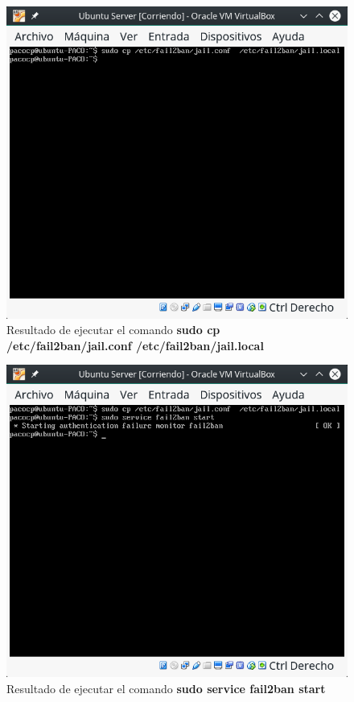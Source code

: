 \begin{figure}[H] %
	\centering
	\includegraphics[scale=0.5]{figuras/figura12.png}  %
	
	
	\caption{Resultado de ejecutar el comando \textbf{sudo cp /etc/fail2ban/jail.conf /etc/fail2ban/jail.local}}
	\label{figura12}
\end{figure}

\begin{figure}[H] %
	\centering
	\includegraphics[scale=0.5]{figuras/figura13.png}  %
	
	
	\caption{Resultado de ejecutar el comando \textbf{sudo service fail2ban start}}
	\label{figura13}
\end{figure}

